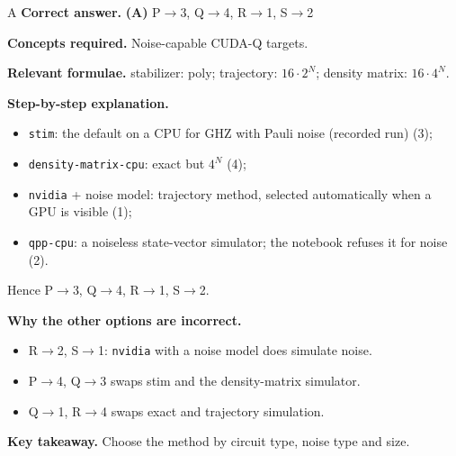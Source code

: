 \documentclass[11pt,a4paper]{article}
\newcommand{\qsep}{\par\vspace{2pt}{\color{black!15}\hrule}\vspace{4pt}}
\begin{document}
\begin{solbox}{A}
\textbf{\color{brand}Correct answer.} \textcolor{okgreen}{\textbf{(A)}} P$\to$3, Q$\to$4, R$\to$1, S$\to$2

\textbf{\color{brand}Concepts required.} Noise-capable CUDA-Q targets.

\textbf{\color{brand}Relevant formulae.} stabilizer: poly; trajectory: $16\cdot2^N$; density matrix: $16\cdot4^N$.

\textbf{\color{brand}Step-by-step explanation.} \begin{itemize}\itemsep0pt
\item \texttt{stim}: the default on a CPU for GHZ with Pauli noise (recorded run) (3);
\item \texttt{density-matrix-cpu}: exact but $4^N$ (4);
\item \texttt{nvidia} + noise model: trajectory method, selected automatically when a GPU is visible (1);
\item \texttt{qpp-cpu}: a noiseless state-vector simulator; the notebook refuses it for noise (2).
\end{itemize}
Hence P$\to$3, Q$\to$4, R$\to$1, S$\to$2.

\textbf{\color{brand}Why the other options are incorrect.}
\begin{itemize}[leftmargin=2.4em, itemsep=1pt, topsep=2pt]
\item[\textbf{(B)}] R$\to$2, S$\to$1: \texttt{nvidia} with a noise model does simulate noise.
\item[\textbf{(C)}] P$\to$4, Q$\to$3 swaps stim and the density-matrix simulator.
\item[\textbf{(D)}] Q$\to$1, R$\to$4 swaps exact and trajectory simulation.
\end{itemize}
\textbf{\color{brand}Key takeaway.} Choose the method by circuit type, noise type and size.
\end{solbox}
\qsep
\end{document}
